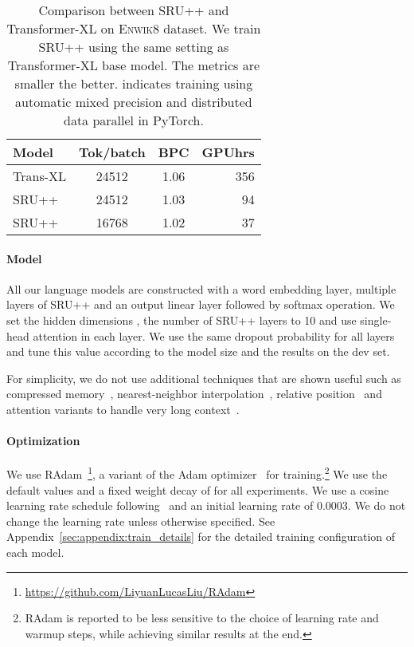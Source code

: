 \documentclass[11pt,a4paper]{article}
\begin{document}
\begin{table}[t!]
    \centering
    \begin{tabular}{lccr}
        \toprule
\bf Model~ & \bf Tok/batch & \bf BPC  & \bf GPUhrs\\
        \hline
        Trans-XL & 24512 & 1.06 & 356\\
        SRU++ &  24512 & 1.03 & 94\\
        SRU++ &  16768 & 1.02 & 37\\
        \bottomrule
    \end{tabular}
    \caption{Comparison between SRU++ and Transformer-XL on \textsc{Enwik8} dataset. We train SRU++ using the same setting as Transformer-XL base model. 
The metrics are smaller the better.  indicates training using automatic mixed precision and distributed data parallel in PyTorch.}
    \label{tab:enwik8_base}
\end{table}

\paragraph{Model}
All our language models are constructed with a word embedding layer, multiple layers of SRU++ and an output linear layer followed by softmax operation. 
We set the hidden dimensions , the number of SRU++ layers to 10 and use single-head attention in each layer.
We use the same dropout probability for all layers and tune this value according to the model size and the results on the dev set.

For simplicity, we do not use additional techniques that are shown useful such as compressed memory~\cite{Rae2020Compressive}, nearest-neighbor interpolation~\cite{Khandelwal2020Generalization}, relative position~\cite{shaw-etal-2018-self,press2020shortformer} and attention variants to handle very long context~\cite{sukhbaatar-etal-2019-adaptive,roy2020efficient}.


\paragraph{Optimization}
We use RAdam~\cite{liu2019radam}\footnote{\url{https://github.com/LiyuanLucasLiu/RAdam}}, a variant of the Adam optimizer~\cite{Kingma:14adam} for training.\footnote{RAdam is reported to be less sensitive to the choice of learning rate and warmup steps, while achieving similar results at the end.}
We use the default  values and a fixed weight decay of  for all experiments.
We use a cosine learning rate schedule following~\citep{dai-etal-2019-transformer} and an initial learning rate of 0.0003.
We do not change the learning rate unless otherwise specified.
See Appendix~\ref{sec:appendix:train_details} for the detailed training configuration of each model.
\end{document}
